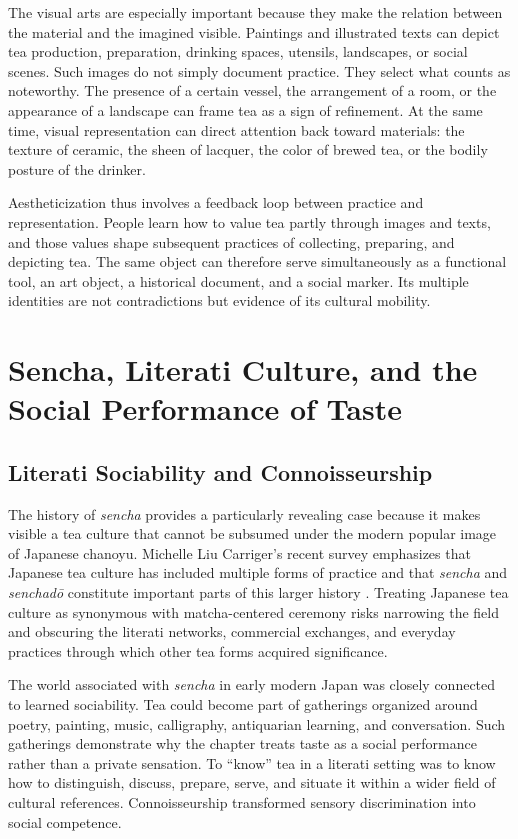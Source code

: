 \documentclass[numbers]{IntechOpen-Book}
\begin{document}
The visual arts are especially important because they make the relation between the material and the imagined visible. Paintings and illustrated texts can depict tea production, preparation, drinking spaces, utensils, landscapes, or social scenes. Such images do not simply document practice. They select what counts as noteworthy. The presence of a certain vessel, the arrangement of a room, or the appearance of a landscape can frame tea as a sign of refinement. At the same time, visual representation can direct attention back toward materials: the texture of ceramic, the sheen of lacquer, the color of brewed tea, or the bodily posture of the drinker.

Aestheticization thus involves a feedback loop between practice and representation. People learn how to value tea partly through images and texts, and those values shape subsequent practices of collecting, preparing, and depicting tea. The same object can therefore serve simultaneously as a functional tool, an art object, a historical document, and a social marker. Its multiple identities are not contradictions but evidence of its cultural mobility.

\section{Sencha, Literati Culture, and the Social Performance of Taste}

\subsection{Literati Sociability and Connoisseurship}

The history of \textit{sencha} provides a particularly revealing case because it makes visible a tea culture that cannot be subsumed under the modern popular image of Japanese chanoyu. Michelle Liu Carriger's recent survey emphasizes that Japanese tea culture has included multiple forms of practice and that \textit{sencha} and \textit{senchadō} constitute important parts of this larger history \cite{carriger2026}. Treating Japanese tea culture as synonymous with matcha-centered ceremony risks narrowing the field and obscuring the literati networks, commercial exchanges, and everyday practices through which other tea forms acquired significance.

The world associated with \textit{sencha} in early modern Japan was closely connected to learned sociability. Tea could become part of gatherings organized around poetry, painting, music, calligraphy, antiquarian learning, and conversation. Such gatherings demonstrate why the chapter treats taste as a social performance rather than a private sensation. To ``know'' tea in a literati setting was to know how to distinguish, discuss, prepare, serve, and situate it within a wider field of cultural references. Connoisseurship transformed sensory discrimination into social competence.
\end{document}
